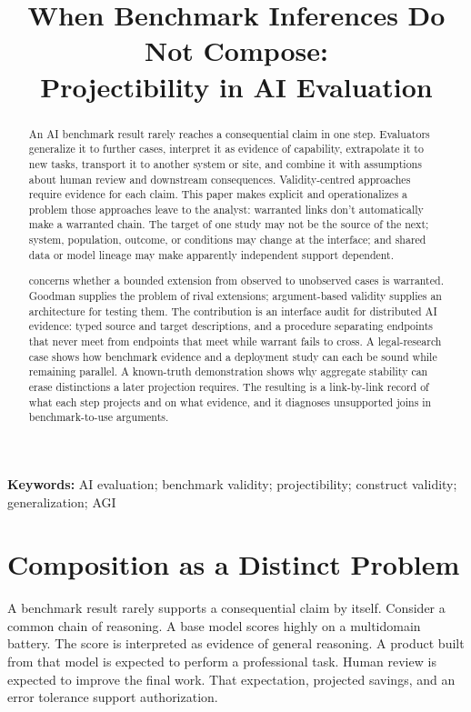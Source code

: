 \documentclass[12pt]{article}
\title{When Benchmark Inferences Do Not Compose:\\Projectibility in AI Evaluation}
\author{}
\date{}
\begin{document}
\maketitle

\begin{abstract}
An AI benchmark result rarely reaches a consequential claim in one step. Evaluators generalize it to further cases, interpret it as evidence of capability, extrapolate it to new tasks, transport it to another system or site, and combine it with assumptions about human review and downstream consequences. Validity-centred approaches require evidence for each claim. This paper makes explicit and operationalizes a problem those approaches leave to the analyst: warranted links don't automatically make a warranted chain. The target of one study may not be the source of the next; system, population, outcome, or conditions may change at the interface; and shared data or model lineage may make apparently independent support dependent.

 concerns whether a bounded extension from observed to unobserved cases is warranted. Goodman supplies the problem of rival extensions; argument-based validity supplies an architecture for testing them. The contribution is an interface audit for distributed AI evidence: typed source and target descriptions, and a procedure separating endpoints that never meet from endpoints that meet while warrant fails to cross. A legal-research case shows how benchmark evidence and a deployment study can each be sound while remaining parallel. A known-truth demonstration shows why aggregate stability can erase distinctions a later projection requires. The resulting  is a link-by-link record of what each step projects and on what evidence, and it diagnoses unsupported joins in benchmark-to-use arguments.
\end{abstract}

\noindent\textbf{Keywords:} AI evaluation; benchmark validity; projectibility; construct validity; generalization; AGI


\section{Composition as a Distinct Problem}\label{sec:introduction}

A benchmark result rarely supports a consequential claim by itself. Consider a common chain of reasoning. A base model scores highly on a multidomain battery. The score is interpreted as evidence of general reasoning. A product built from that model is expected to perform a professional task. Human review is expected to improve the final work. That expectation, projected savings, and an error tolerance support authorization.
\end{document}
